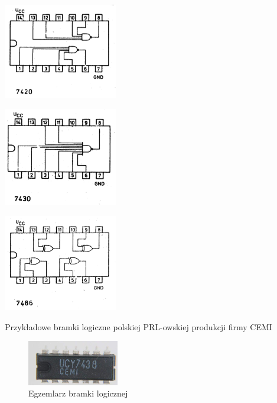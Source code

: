 \documentclass[a4paper,12pt]{article}
\begin{document}
\begin{table}[h!]
\begin{minipage}{5cm}
   \centering
   \includegraphics[width=5cm]{grafika/cemi/2nand.png}
\end{minipage}
\begin{minipage}{5cm}
   \centering
   \includegraphics[width=5cm]{grafika/cemi/1nand.png}
\end{minipage}
\begin{minipage}{5cm}
   \centering
   \includegraphics[width=5cm]{grafika/cemi/4xor.png}
\end{minipage}

\caption*{Przykładowe bramki logiczne polskiej PRL-owskiej produkcji firmy CEMI}
\end{table}

\begin{figure}[htb]
   \centering
   \includegraphics[width=4cm]{grafika/cemi/ucy7438.jpg}
   \caption*{Egzemlarz bramki logicznej}
\end{figure}
\end{document}
